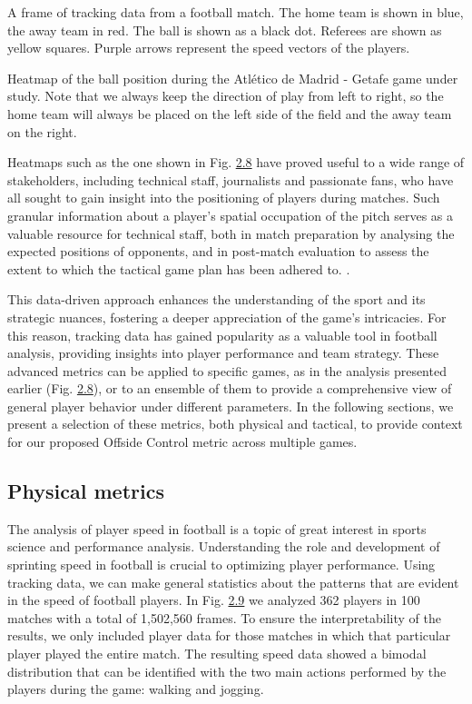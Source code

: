 \documentclass[twoside,nohyper]{tufte-book}
\begin{document}
A frame of tracking data from a football match. The home
team is shown in blue, the away team in red. The ball is shown as a
black dot. Referees are shown as yellow squares. Purple arrows represent
the speed vectors of the players.

Heatmap of the ball position during the Atlético de Madrid -
Getafe game under study. Note that we always keep the direction of play
from left to right, so the home team will always be placed on the left
side of the field and the away team on the right.

Heatmaps such as the one shown in Fig. \protect\hyperlink{f2.8}{2.8} have proved useful to a wide range of stakeholders,
including technical staff, journalists and passionate fans, who have all
sought to gain insight into the positioning of players during matches.
Such granular information about a player's spatial occupation of the
pitch serves as a valuable resource for technical staff, both in match
preparation by analysing the expected positions of opponents, and in
post-match evaluation to assess the extent to which the tactical game
plan has been adhered to. \citep{Garrido_2022}.

This data-driven approach enhances the understanding of the sport and
its strategic nuances, fostering a deeper appreciation of the game's
intricacies. For this reason, tracking data has gained popularity as a
valuable tool in football analysis, providing insights into player
performance and team strategy. These advanced metrics can be applied to
specific games, as in the analysis presented earlier (Fig.
\protect\hyperlink{f2.8}{2.8}), or to an ensemble
of them to provide a comprehensive view of general player behavior under
different parameters. In the following sections, we present a selection
of these metrics, both physical and tactical, to provide context for our
proposed Offside Control metric across multiple games.

\hypertarget{physical-metrics}{%
\subsection{Physical metrics}\label{physical-metrics}}

The analysis of player speed in football is a topic of great interest in
sports science and performance analysis. Understanding the role and
development of sprinting speed in football is crucial to optimizing
player performance. Using tracking data, we can make general statistics
about the patterns that are evident in the speed of football players. In
Fig. \protect\hyperlink{f2.9}{2.9} we analyzed 362
players in 100 matches with a total of 1,502,560 frames. To ensure the
interpretability of the results, we only included player data for those
matches in which that particular player played the entire match. The
resulting speed data showed a bimodal distribution that can be
identified with the two main actions performed by the players during the
game: walking and jogging.
\end{document}
